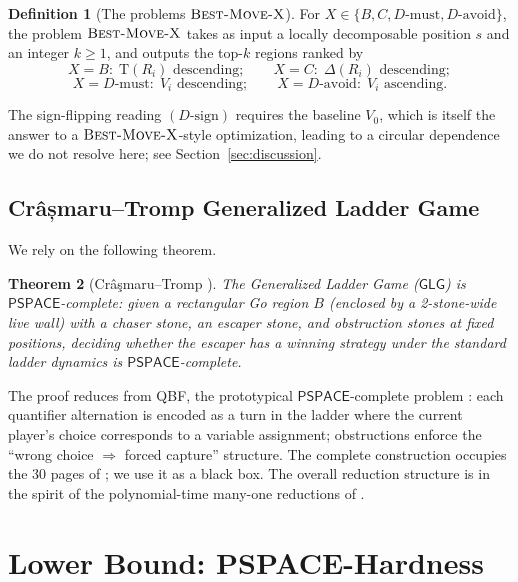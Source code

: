 \documentclass[11pt,a4paper]{amsart}
\newtheorem{theorem}{Theorem}[section]
\theoremstyle{definition}
\newtheorem{definition}[theorem]{Definition}
\theoremstyle{remark}
\newcommand{\Tt}{\mathrm{T}}
\newcommand{\PSPACE}{\mathsf{PSPACE}}
\newcommand{\GLG}{\mathsf{GLG}}
\newcommand{\BMX}{\textsc{Best-Move-X}}
\begin{document}
\begin{definition}[The problems $\BMX$]\label{def:BMX}
For $X \in \{B, C, D\text{-must}, D\text{-avoid}\}$, the problem
$\BMX$ takes as input a locally decomposable position $s$ and an integer
$k \geq 1$, and outputs the top-$k$ regions ranked by
\[
  X = B: \;\Tt(R_i) \text{ descending};
  \qquad
  X = C: \;\Delta(R_i) \text{ descending};
\]
\[
  X = D\text{-must}: \;V_i \text{ descending};
  \qquad
  X = D\text{-avoid}: \;V_i \text{ ascending}.
\]
\end{definition}

The sign-flipping reading $(D\text{-sign})$ requires the baseline $V_0$,
which is itself the answer to a $\BMX$-style optimization, leading to
a circular dependence we do not resolve here; see
Section~\ref{sec:discussion}.

\subsection{Crâșmaru--Tromp Generalized Ladder Game}

We rely on the following theorem.

\begin{theorem}[Cr\^{a}\c{s}maru--Tromp \cite{CrasmaruTromp2000}]
\label{thm:GLG}
The Generalized Ladder Game ($\GLG$) is $\PSPACE$-complete: given a
rectangular Go region $B$ (enclosed by a 2-stone-wide live wall) with a
chaser stone, an escaper stone, and obstruction stones at fixed
positions, deciding whether the escaper has a winning strategy under the
standard ladder dynamics is $\PSPACE$-complete.
\end{theorem}

The proof reduces from QBF, the prototypical $\PSPACE$-complete problem
\cite{StockmeyerMeyer1973}: each quantifier alternation is encoded as a
turn in the ladder where the current player's choice corresponds to a
variable assignment; obstructions enforce the ``wrong choice $\Rightarrow$
forced capture'' structure. The complete construction occupies the
30 pages of \cite{CrasmaruTromp2000}; we use it as a black box. The
overall reduction structure is in the spirit of the polynomial-time
many-one reductions of \cite{Karp1972}.

\section{Lower Bound: PSPACE-Hardness}\label{sec:lower}
\end{document}
